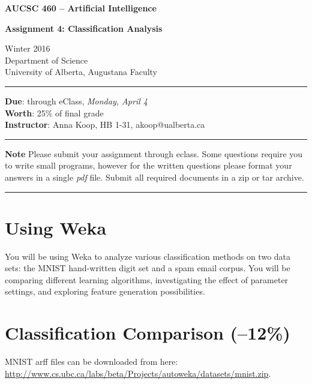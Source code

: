 \documentclass[12pt]{article}
\begin{document}
\noindent
{\Large\bf AUCSC 460 -- Artificial Intelligence}

\vspace*{1\baselineskip}

\noindent
{\large\bf Assignment 4: Classification Analysis}

\vspace*{1\baselineskip}

\noindent
Winter 2016\\
Department of Science\\
University of Alberta, Augustana Faculty

\vspace*{1.75\baselineskip}
\hrule

\vspace*{0.75\baselineskip}

\noindent
{\bf Due}: through eClass, {\em Monday, April 4}\\
{\bf Worth}: 25\% of final grade
\\
{\bf Instructor}: Anna Koop, HB 1-31, akoop@ualberta.ca

\vspace*{0.75\baselineskip}

\hrule

\vspace*{1\baselineskip}

\noindent
{\bf Note}
Please submit your assignment through eclass. Some questions require you to write small programs,
however for the written questions please format your answers
in a single {\em pdf\/} file.
Submit all required documents in a zip or tar archive.


\vspace*{1\baselineskip}

\hrule

\section{Using Weka}
You will be using Weka to analyze various classification methods on two data sets: the MNIST hand-written digit set and a spam email corpus. You will be comparing different learning algorithms, investigating the effect of parameter settings, and exploring feature generation possibilities.

\section{Classification Comparison \rm(--12\%)}
MNIST arff files can be downloaded from here: \url{http://www.cs.ubc.ca/labs/beta/Projects/autoweka/datasets/mnist.zip}.
\end{document}

